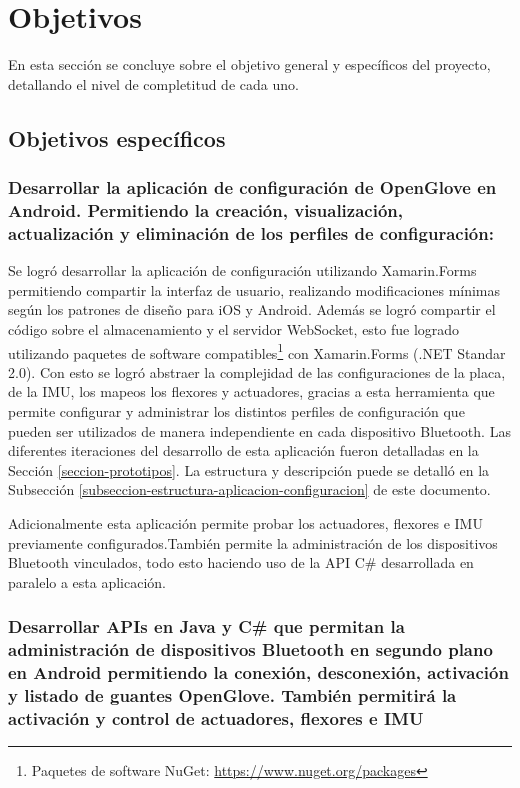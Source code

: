 \section{Objetivos}
En esta sección se concluye sobre el objetivo general y específicos del proyecto, detallando el nivel de completitud de cada uno.

\subsection{Objetivos específicos}

\subsubsection{Desarrollar la aplicación de configuración de OpenGlove en Android. Permitiendo la creación, visualización, actualización y eliminación de los perfiles de configuración:}

Se logró desarrollar la aplicación de configuración utilizando Xamarin.Forms permitiendo compartir la interfaz de usuario, realizando modificaciones mínimas según los patrones de diseño para iOS y Android. Además se logró compartir el código sobre el almacenamiento y el servidor WebSocket,  esto fue logrado utilizando paquetes de software compatibles\footnote{Paquetes de software NuGet: \url{https://www.nuget.org/packages}} con Xamarin.Forms (.NET Standar 2.0). Con esto se logró abstraer la complejidad de las configuraciones de la placa, de la IMU, los mapeos los flexores y actuadores, gracias a esta herramienta que permite configurar y administrar los distintos perfiles de configuración que pueden ser utilizados de manera independiente en cada dispositivo Bluetooth. Las diferentes iteraciones del desarrollo de esta aplicación fueron detalladas en la Sección \ref{seccion-prototipos}. La estructura y descripción puede se detalló en la Subsección \ref{subseccion-estructura-aplicacion-configuracion} de este documento.

Adicionalmente esta aplicación permite probar los actuadores, flexores e IMU previamente configurados.También permite la administración de los dispositivos Bluetooth vinculados, todo esto haciendo uso de la API C\# desarrollada en paralelo a esta aplicación.


\subsubsection{Desarrollar APIs en Java y C\# que permitan la administración de dispositivos Bluetooth en segundo plano en Android permitiendo la conexión, desconexión, activación y listado de guantes OpenGlove.  También permitirá la activación y control de actuadores, flexores e IMU} 

